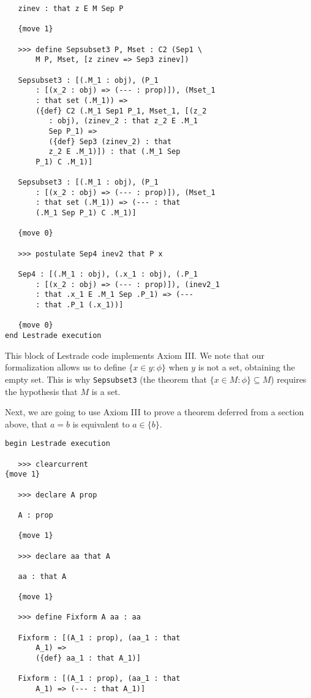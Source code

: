 \documentclass[12pt]{article}
\begin{document}
\begin{enumerate}
\begin{verbatim}
   zinev : that z E M Sep P

   {move 1}

   >>> define Sepsubset3 P, Mset : C2 (Sep1 \
       M P, Mset, [z zinev => Sep3 zinev])

   Sepsubset3 : [(.M_1 : obj), (P_1 
       : [(x_2 : obj) => (--- : prop)]), (Mset_1 
       : that set (.M_1)) => 
       ({def} C2 (.M_1 Sep1 P_1, Mset_1, [(z_2 
          : obj), (zinev_2 : that z_2 E .M_1 
          Sep P_1) => 
          ({def} Sep3 (zinev_2) : that 
          z_2 E .M_1)]) : that (.M_1 Sep 
       P_1) C .M_1)]

   Sepsubset3 : [(.M_1 : obj), (P_1 
       : [(x_2 : obj) => (--- : prop)]), (Mset_1 
       : that set (.M_1)) => (--- : that 
       (.M_1 Sep P_1) C .M_1)]

   {move 0}

   >>> postulate Sep4 inev2 that P x

   Sep4 : [(.M_1 : obj), (.x_1 : obj), (.P_1 
       : [(x_2 : obj) => (--- : prop)]), (inev2_1 
       : that .x_1 E .M_1 Sep .P_1) => (--- 
       : that .P_1 (.x_1))]

   {move 0}
end Lestrade execution

\end{verbatim}

This block of Lestrade code implements Axiom III.  We note that our formalization allows us to define $\{x \in y:\phi\}$ when $y$ is not a set, obtaining the empty set.  This is why {\tt Sepsubset3} (the theorem that $\{x \in M:\phi\} \subseteq M$) requires the hypothesis that $M$ is a set.

Next, we are going to use Axiom III to prove a theorem deferred from a section above, that $a = b$ is equivalent to $a \in \{b\}$.

\begin{verbatim}
begin Lestrade execution

   >>> clearcurrent
{move 1}

   >>> declare A prop

   A : prop

   {move 1}

   >>> declare aa that A

   aa : that A

   {move 1}

   >>> define Fixform A aa : aa

   Fixform : [(A_1 : prop), (aa_1 : that 
       A_1) => 
       ({def} aa_1 : that A_1)]

   Fixform : [(A_1 : prop), (aa_1 : that 
       A_1) => (--- : that A_1)]


\end{verbatim}
\end{enumerate}
\end{document}
